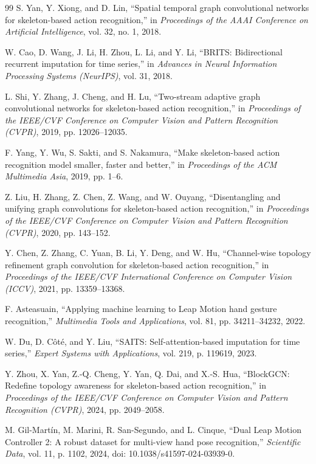 \documentclass[10pt,twocolumn]{article}
\begin{document}
\begin{thebibliography}{99}
S. Yan, Y. Xiong, and D. Lin, ``Spatial temporal graph convolutional networks for skeleton-based action recognition,'' in \textit{Proceedings of the AAAI Conference on Artificial Intelligence}, vol. 32, no. 1, 2018.

W. Cao, D. Wang, J. Li, H. Zhou, L. Li, and Y. Li, ``BRITS: Bidirectional recurrent imputation for time series,'' in \textit{Advances in Neural Information Processing Systems (NeurIPS)}, vol. 31, 2018.

L. Shi, Y. Zhang, J. Cheng, and H. Lu, ``Two-stream adaptive graph convolutional networks for skeleton-based action recognition,'' in \textit{Proceedings of the IEEE/CVF Conference on Computer Vision and Pattern Recognition (CVPR)}, 2019, pp. 12026--12035.

F. Yang, Y. Wu, S. Sakti, and S. Nakamura, ``Make skeleton-based action recognition model smaller, faster and better,'' in \textit{Proceedings of the ACM Multimedia Asia}, 2019, pp. 1--6.

Z. Liu, H. Zhang, Z. Chen, Z. Wang, and W. Ouyang, ``Disentangling and unifying graph convolutions for skeleton-based action recognition,'' in \textit{Proceedings of the IEEE/CVF Conference on Computer Vision and Pattern Recognition (CVPR)}, 2020, pp. 143--152.

Y. Chen, Z. Zhang, C. Yuan, B. Li, Y. Deng, and W. Hu, ``Channel-wise topology refinement graph convolution for skeleton-based action recognition,'' in \textit{Proceedings of the IEEE/CVF International Conference on Computer Vision (ICCV)}, 2021, pp. 13359--13368.

F. Asteasuain, ``Applying machine learning to Leap Motion hand gesture recognition,'' \textit{Multimedia Tools and Applications}, vol. 81, pp. 34211--34232, 2022.

W. Du, D. C\^{o}t\'{e}, and Y. Liu, ``SAITS: Self-attention-based imputation for time series,'' \textit{Expert Systems with Applications}, vol. 219, p. 119619, 2023.

Y. Zhou, X. Yan, Z.-Q. Cheng, Y. Yan, Q. Dai, and X.-S. Hua, ``BlockGCN: Redefine topology awareness for skeleton-based action recognition,'' in \textit{Proceedings of the IEEE/CVF Conference on Computer Vision and Pattern Recognition (CVPR)}, 2024, pp. 2049--2058.

M. Gil-Mart\'{i}n, M. Marini, R. San-Segundo, and L. Cinque, ``Dual Leap Motion Controller 2: A robust dataset for multi-view hand pose recognition,'' \textit{Scientific Data}, vol. 11, p. 1102, 2024, doi: 10.1038/s41597-024-03939-0.


\end{thebibliography}
\end{document}
